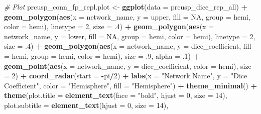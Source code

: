 \documentclass[
]{article}
\newenvironment{Shaded}{\begin{snugshade}}{\end{snugshade}}
\newcommand{\CommentTok}[1]{\textcolor[rgb]{0.56,0.35,0.01}{\textit{#1}}}
\newcommand{\DataTypeTok}[1]{\textcolor[rgb]{0.13,0.29,0.53}{#1}}
\newcommand{\DecValTok}[1]{\textcolor[rgb]{0.00,0.00,0.81}{#1}}
\newcommand{\FloatTok}[1]{\textcolor[rgb]{0.00,0.00,0.81}{#1}}
\newcommand{\KeywordTok}[1]{\textcolor[rgb]{0.13,0.29,0.53}{\textbf{#1}}}
\newcommand{\NormalTok}[1]{#1}
\newcommand{\OperatorTok}[1]{\textcolor[rgb]{0.81,0.36,0.00}{\textbf{#1}}}
\newcommand{\OtherTok}[1]{\textcolor[rgb]{0.56,0.35,0.01}{#1}}
\newcommand{\StringTok}[1]{\textcolor[rgb]{0.31,0.60,0.02}{#1}}
\begin{document}
\begin{Shaded}
\begin{Highlighting}[]
{{\CommentTok{# Plot}
\NormalTok{prcusp_conn_fp_repl.plot <-}\StringTok{ }\KeywordTok{ggplot}\NormalTok{(}\DataTypeTok{data =}\NormalTok{ prcusp_dice_rep_all) }\OperatorTok{+}\StringTok{ }
\StringTok{   }\KeywordTok{geom_polygon}\NormalTok{(}\KeywordTok{aes}\NormalTok{(}\DataTypeTok{x =}\NormalTok{ network_name, }\DataTypeTok{y =}\NormalTok{ upper, }\DataTypeTok{fill =} \OtherTok{NA}\NormalTok{, }\DataTypeTok{group =}\NormalTok{ hemi, }\DataTypeTok{color =}\NormalTok{ hemi), }
               \DataTypeTok{linetype =} \DecValTok{2}\NormalTok{, }\DataTypeTok{size =} \FloatTok{.4}\NormalTok{) }\OperatorTok{+}\StringTok{ }
\StringTok{  }\KeywordTok{geom_polygon}\NormalTok{(}\KeywordTok{aes}\NormalTok{(}\DataTypeTok{x =}\NormalTok{ network_name, }\DataTypeTok{y =}\NormalTok{ lower, }\DataTypeTok{fill =} \OtherTok{NA}\NormalTok{, }\DataTypeTok{group =}\NormalTok{ hemi, }\DataTypeTok{color =}\NormalTok{ hemi), }
               \DataTypeTok{linetype =} \DecValTok{2}\NormalTok{, }\DataTypeTok{size =} \FloatTok{.4}\NormalTok{) }\OperatorTok{+}
\StringTok{  }\KeywordTok{geom_polygon}\NormalTok{(}\KeywordTok{aes}\NormalTok{(}\DataTypeTok{x =}\NormalTok{ network_name, }\DataTypeTok{y =}\NormalTok{ dice_coefficient, }\DataTypeTok{fill =}\NormalTok{ hemi, }\DataTypeTok{group =}\NormalTok{ hemi, }\DataTypeTok{color =}\NormalTok{ hemi), }
               \DataTypeTok{size =} \FloatTok{.9}\NormalTok{, }\DataTypeTok{alpha =} \FloatTok{.1}\NormalTok{) }\OperatorTok{+}
\StringTok{  }\KeywordTok{geom_point}\NormalTok{(}\KeywordTok{aes}\NormalTok{(}\DataTypeTok{x =}\NormalTok{ network_name, }\DataTypeTok{y =}\NormalTok{ dice_coefficient, }\DataTypeTok{color =}\NormalTok{ hemi), }\DataTypeTok{size =} \DecValTok{2}\NormalTok{) }\OperatorTok{+}\StringTok{ }
\StringTok{  }\KeywordTok{coord_radar}\NormalTok{(}\DataTypeTok{start =} \OperatorTok{-}\NormalTok{pi}\OperatorTok{/}\DecValTok{2}\NormalTok{) }\OperatorTok{+}
\StringTok{  }\KeywordTok{labs}\NormalTok{(}\DataTypeTok{x =} \StringTok{"Network Name"}\NormalTok{,}
       \DataTypeTok{y =} \StringTok{"Dice Coefficient"}\NormalTok{, }
       \DataTypeTok{color =} \StringTok{"Hemisphere"}\NormalTok{,}
       \DataTypeTok{fill =} \StringTok{"Hemisphere"}\NormalTok{) }\OperatorTok{+}\StringTok{  }
\StringTok{   }\KeywordTok{theme_minimal}\NormalTok{() }\OperatorTok{+}
\StringTok{   }\KeywordTok{theme}\NormalTok{(}\DataTypeTok{plot.title =} \KeywordTok{element_text}\NormalTok{(}\DataTypeTok{face =} \StringTok{"bold"}\NormalTok{, }\DataTypeTok{hjust =} \DecValTok{0}\NormalTok{, }\DataTypeTok{size =} \DecValTok{14}\NormalTok{), }
        \DataTypeTok{plot.subtitle =} \KeywordTok{element_text}\NormalTok{(}\DataTypeTok{hjust =} \DecValTok{0}\NormalTok{, }\DataTypeTok{size =} \DecValTok{14}\NormalTok{),}
}}
\end{Highlighting}
\end{Shaded}
\end{document}
